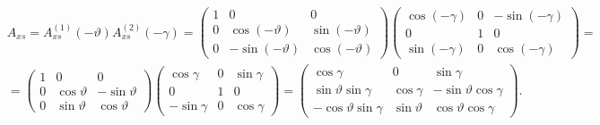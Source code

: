 \documentclass[a4paper,14pt]{article}
\theoremstyle{plain} %
\theoremstyle{definition} %
\theoremstyle{remark} %
\begin{document}
{$$
    \begin{aligned}
         & A_{x s}=A_{x s}^{(1)}(-\vartheta) A_{x s}^{(2)}(-\gamma)=\left(\begin{array}{ccc}1 & 0 & 0 \\0 & \cos (-\vartheta) & \sin (-\vartheta) \\0 & -\sin (-\vartheta) & \cos (-\vartheta)\end{array}\right)\left(\begin{array}{ccc}\cos (-\gamma) & 0 & -\sin (-\gamma) \\0 & 1 & 0 \\\sin (-\gamma) & 0 & \cos (-\gamma)\end{array}\right)= \\
         & =\left(\begin{array}{ccc}1 & 0 & 0 \\0 & \cos \vartheta & -\sin \vartheta \\0 & \sin \vartheta & \cos \vartheta\end{array}\right)\left(\begin{array}{ccc}\cos \gamma & 0 & \sin \gamma \\0 & 1 & 0 \\-\sin \gamma & 0 & \cos \gamma\end{array}\right)=\left(\begin{array}{ccc}\cos \gamma & 0 & \sin \gamma \\\sin \vartheta \sin \gamma & \cos \gamma & -\sin \vartheta \cos \gamma \\-\cos \vartheta \sin \gamma & \sin \vartheta & \cos \vartheta \cos \gamma\end{array}\right) \text {. }
    \end{aligned}
$$

}
\end{document}
